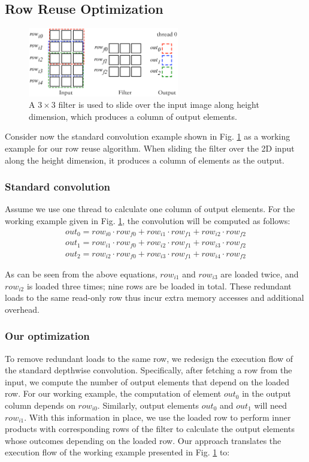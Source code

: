 \subsection{Row Reuse Optimization}
\label{sec:rowreuse}
\begin{figure}[t!]
	\centering
	\includegraphics[width=0.8\columnwidth,height=3cm]{./figure/rowreuse.eps}
\caption{A $3 \times 3$ filter is used to slide over the input image along height dimension, which produces a column of output elements.}
\label{fig:rowreuse}
\end{figure}

 Consider now the standard convolution example shown in Fig. \ref{fig:rowreuse} as a working example for our row
reuse algorithm. When sliding the filter over the 2D input along the height dimension, it produces a column of elements as the output.

\subsubsection{Standard convolution} Assume we use one thread to calculate one column of output elements.
For the working example given in Fig. \ref{fig:rowreuse}, the convolution will be computed as follows:
\begin{gather*}
  out_0=row_{i0} \cdot row_{f0} + row_{i1} \cdot row_{f1} + row_{i2} \cdot row_{f2} \\
out_{1}=row_{i1} \cdot row_{f0} + row_{i2} \cdot row_{f1} + row_{i3} \cdot row_{f2} \\
out_{2}=row_{i2} \cdot row_{f0} + row_{i3} \cdot row_{f1} + row_{i4} \cdot row_{f2}
\end{gather*}

As can be seen from the above equations, $row_{i1}$ and $row_{i3}$ are loaded twice, and $row_{i2}$ is loaded three times; nine rows are be
loaded in total. These redundant loads to the same read-only row thus incur extra memory accesses and additional overhead.

\subsubsection{Our optimization}
To remove redundant loads to the same row, we redesign the execution flow of the standard depthwise convolution. Specifically, after
fetching a row from the input, we compute the number of output elements that depend on the loaded row. For our working example, the
computation of element $out_0$ in the output column depends on $row_{i0}$. Similarly, output elements $out_0$ and $out_1$ will need
$row_{i1}$. With this information in place, we use the loaded row to perform inner products with corresponding rows of the filter to
calculate the output elements whose outcomes depending on the loaded row. Our approach translates the execution flow of the working example
presented in Fig. \ref {fig:rowreuse} to:


